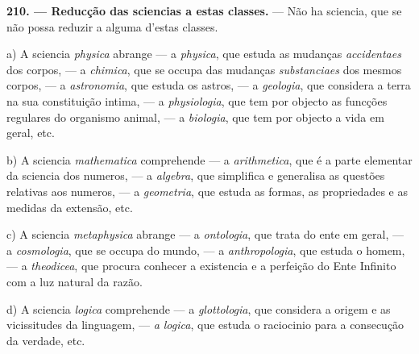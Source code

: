 \textbf{210. --- Reducção das sciencias a estas classes.} --- Não ha sciencia, que se não possa reduzir a alguma d'estas classes.

a) A sciencia \emph{physica} abrange --- a \emph{physica}, que estuda as mudanças \emph{accidentaes} dos corpos, --- a \emph{chimica}, que se occupa das mudanças \emph{substanciaes} dos mesmos corpos, --- a \emph{astronomia}, que estuda os astros, --- a \emph{geologia}, que considera a terra na   sua constituição intima, --- a \emph{physiologia}, que tem por objecto as funcções regulares do organismo animal, --- a \emph{biologia}, que tem por objecto a vida em geral, etc.

b) A sciencia \emph{mathematica} comprehende --- a \emph{arithmetica}, que é a parte elementar da sciencia dos numeros, --- a \emph{algebra}, que simplifica e generalisa as questões relativas aos numeros, --- a \emph{geometria}, que estuda as formas, as propriedades e as medidas da extensão, etc.

c) A sciencia \emph{metaphysica} abrange --- a \emph{ontologia}, que trata do ente em geral, --- a \emph{cosmologia}, que se occupa do mundo, --- a \emph{anthropologia}, que estuda o homem, --- a \emph{theodicea}, que procura conhecer a existencia e a perfeição do Ente Infinito com a luz natural da razão.

d) A sciencia \emph{logica} comprehende --- a \emph{glottologia}, que considera a origem e as vicissitudes da linguagem, --- \emph{a logica}, que estuda o raciocinio para a consecução da verdade, etc.

